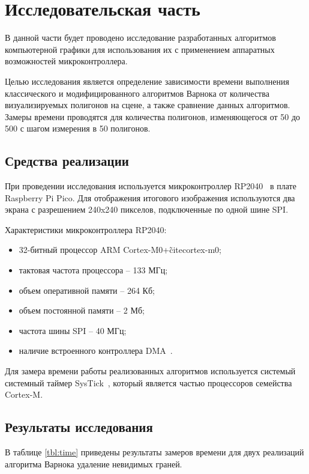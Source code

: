 \chapter{Исследовательская часть}

В данной части будет проводено исследование разработанных алгоритмов компьютерной графики для использования их с применением аппаратных возможностей микроконтроллера. 

Целью исследования является определение зависимости времени выполнения классического и модифицированного алгоритмов Варнока от количества визуализируемых полигонов на сцене, а также сравнение данных алгоритмов. Замеры времени проводятся для количества полигонов, изменяющегося от 50 до 500 с шагом измерения в 50 полигонов. 

\section{Средства реализации}
При проведении исследования используется микроконтроллер RP2040~\cite{rp2040} в плате Raspberry Pi Pico. Для отображения итогового изображения используются два экрана с разрешением 240x240 пикселов, подключенные по одной шине SPI. 

Характеристики микроконтроллера RP2040:
\begin{itemize}
    \item 32-битный процессор ARM Cortex-M0+\~cite{cortex-m0};
    \item тактовая частота процессора -- 133 МГц;
    \item объем оперативной памяти -- 264 Кб;
    \item объем постоянной памяти -- 2 Мб;
    \item частота шины SPI -- 40 МГц;
    \item наличие встроенного контроллера DMA~\cite{dma}. 
\end{itemize}

Для замера времени работы реализованных алгоритмов используется системый системный таймер SysTick~\cite{systick}, который является частью процессоров семейства Cortex-M. 

\section{Результаты исследования}
В таблице \ref{tbl:time} приведены результаты замеров времени для двух реализаций алгоритма Варнока удаление невидимых граней.

